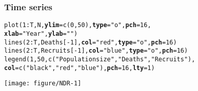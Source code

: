 \documentclass[color=usenames,dvipsnames]{beamer}\usepackage[]{graphicx}\usepackage[]{color}
\makeatletter
\newcommand{\hlnum}[1]{\textcolor[rgb]{0.69,0.494,0}{#1}}%
\newcommand{\hlstr}[1]{\textcolor[rgb]{0.749,0.012,0.012}{#1}}%
\newcommand{\hlopt}[1]{\textcolor[rgb]{0,0,0}{#1}}%
\newcommand{\hlstd}[1]{\textcolor[rgb]{0,0,0}{#1}}%
\newcommand{\hlkwc}[1]{\textcolor[rgb]{0,0,0}{\textbf{#1}}}%
\newcommand{\hlkwd}[1]{\textcolor[rgb]{0.004,0.004,0.506}{#1}}%
\newenvironment{kframe}{%
 \def\at@end@of@kframe{}%
 \ifinner\ifhmode%
  \def\at@end@of@kframe{\end{minipage}}%
  \begin{minipage}{\columnwidth}%
 \fi\fi%
 \def\FrameCommand##1{\hskip\@totalleftmargin \hskip-\fboxsep
 \colorbox{shadecolor}{##1}\hskip-\fboxsep
     \hskip-\linewidth \hskip-\@totalleftmargin \hskip\columnwidth}%
 \MakeFramed {\advance\hsize-\width
   \@totalleftmargin\z@ \linewidth\hsize
   \@setminipage}}%
 {\par\unskip\endMakeFramed%
 \at@end@of@kframe}
\newenvironment{knitrout}{}{} %
\makeatother
\begin{document}
\begin{frame}[fragile]
  \frametitle{Time series}
\begin{knitrout}\tiny
{}\color{fgcolor}\begin{kframe}
\begin{alltt}
\hlkwd{plot}\hlstd{(}\hlnum{1}\hlopt{:}\hlstd{T, N,} \hlkwc{ylim}\hlstd{=}\hlkwd{c}\hlstd{(}\hlnum{0}\hlstd{,} \hlnum{50}\hlstd{),} \hlkwc{type}\hlstd{=}\hlstr{"o"}\hlstd{,} \hlkwc{pch}\hlstd{=}\hlnum{16}\hlstd{,}
     \hlkwc{xlab}\hlstd{=}\hlstr{"Year"}\hlstd{,} \hlkwc{ylab}\hlstd{=}\hlstr{""}\hlstd{)}
\hlkwd{lines}\hlstd{(}\hlnum{2}\hlopt{:}\hlstd{T, Deaths[}\hlopt{-}\hlnum{1}\hlstd{],} \hlkwc{col}\hlstd{=}\hlstr{"red"}\hlstd{,} \hlkwc{type}\hlstd{=}\hlstr{"o"}\hlstd{,} \hlkwc{pch}\hlstd{=}\hlnum{16}\hlstd{)}
\hlkwd{lines}\hlstd{(}\hlnum{2}\hlopt{:}\hlstd{T, Recruits[}\hlopt{-}\hlnum{1}\hlstd{],} \hlkwc{col}\hlstd{=}\hlstr{"blue"}\hlstd{,} \hlkwc{type}\hlstd{=}\hlstr{"o"}\hlstd{,} \hlkwc{pch}\hlstd{=}\hlnum{16}\hlstd{)}
\hlkwd{legend}\hlstd{(}\hlnum{1}\hlstd{,} \hlnum{50}\hlstd{,} \hlkwd{c}\hlstd{(}\hlstr{"Population size"}\hlstd{,} \hlstr{"Deaths"}\hlstd{,} \hlstr{"Recruits"}\hlstd{),}
       \hlkwc{col}\hlstd{=}\hlkwd{c}\hlstd{(}\hlstr{"black"}\hlstd{,} \hlstr{"red"}\hlstd{,} \hlstr{"blue"}\hlstd{),} \hlkwc{pch}\hlstd{=}\hlnum{16}\hlstd{,} \hlkwc{lty}\hlstd{=}\hlnum{1}\hlstd{)}
\end{alltt}
\end{kframe}

{\centering \texttt{[image: figure/NDR-1]} 

}



\end{knitrout}
\end{frame}
\end{document}
